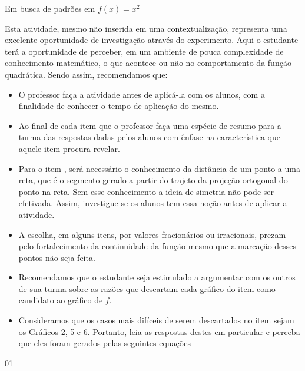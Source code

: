 \begin{sugestions}{Em busca de padrões em \(f(x)=x^2\)}
{
Esta atividade, mesmo não inserida em uma contextualização, representa uma excelente oportunidade de investigação através do experimento. Aqui o estudante terá a oportunidade de perceber, em um ambiente de pouca complexidade de conhecimento matemático, o que acontece ou não no comportamento da função quadrática. Sendo assim, recomendamos que:

\begin{itemize}[itemsep=0pt]
\item O professor faça a atividade antes de aplicá-la com os alunos, com a finalidade de conhecer o tempo de aplicação do mesmo.
\item Ao final de cada item que o professor faça uma espécie de resumo para a turma das respostas dadas pelos alunos com ênfase na característica que aquele item procura revelar.
\item Para o item , será necessário o conhecimento da distância de um ponto a uma reta, que é o segmento gerado a partir do trajeto da projeção ortogonal do ponto na reta. Sem esse conhecimento a ideia de simetria não pode ser efetivada. Assim, investigue se os alunos tem essa noção antes de aplicar a atividade.
\item A escolha, em alguns itens, por valores fracionários ou irracionais, prezam pelo fortalecimento da continuidade da função mesmo que a marcação desses pontos não seja feita.
\item Recomendamos que o estudante seja estimulado a argumentar com os outros de sua turma sobre as razões que descartam cada gráfico do item  como candidato ao gráfico de $f$.
\item Consideramos que os casos mais difíceis de serem descartados no item  sejam os Gráficos 2, 5 e 6. Portanto, leia as respostas destes em particular e perceba que eles foram gerados pelas seguintes equações
\end{itemize}
}{0}{1}
\end{sugestions}
